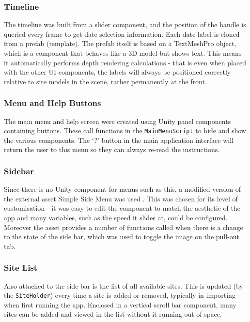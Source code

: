 \documentclass[12pt, a4paper]{article}
\begin{document}
\subsubsection{Timeline}
The timeline was built from a slider component, and the position of the handle is queried every frame to get date selection information. Each date label is cloned from a prefab (template). The prefab itself is based on a TextMeshPro object, which is a component that behaves like a 3D model but shows text. This means it automatically performs depth rendering calculations - that is even when placed with the other UI components, the labels will always be positioned correctly relative to site models in the scene, rather permanently at the front.

\subsubsection{Menu and Help Buttons}
The main menu and help screen were created using Unity panel components containing buttons. These call functions in the \verb|MainMenuScript| to hide and show the various components. The `?' button in the main application interface will return the user to this menu so they can always re-read the instructions.

\subsubsection{Sidebar}
Since there is no Unity component for menus such as this, a modified version of the external asset Simple Side Menu was used \cite{design:sidemenu}. This was chosen for its level of customisation - it was easy to edit the component to match the aesthetic of the app and many variables, such as the speed it slides at, could be configured. Moreover the asset provides a number of functions called when there is a change to the state of the side bar, which was used to toggle the image on the pull-out tab.

\subsubsection{Site List}
Also attached to the side bar is the list of all available sites. This is updated (by the \verb|SiteHolder|) every time a site is added or removed, typically in importing when first running the app. Enclosed in a vertical scroll bar component, many sites can be added and viewed in the list without it running out of space.
\end{document}
